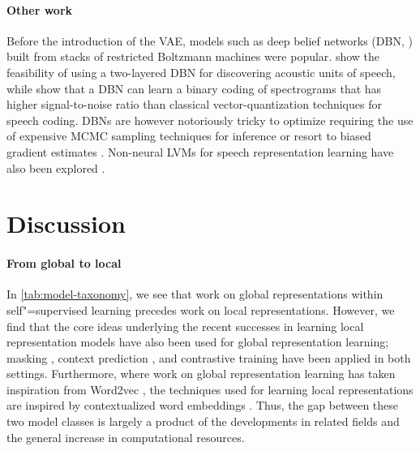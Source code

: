 {\paragraph{Other work}
Before the introduction of the VAE, models such as deep belief networks (DBN, \citealp{hinton_fast_2006}) built from stacks of restricted Boltzmann machines \parencite{smolensky_chapter_1986,fischer_training_2014} were popular. \textcite{lee_unsupervised_2009} show the feasibility of using a two-layered DBN for discovering acoustic units of speech, while \textcite{deng_binary_2010} show that a DBN can learn a binary coding of spectrograms that has higher signal-to-noise ratio than classical vector-quantization techniques for speech coding.
DBNs are however notoriously tricky to optimize requiring the use of expensive MCMC sampling techniques for inference or resort to biased gradient estimates \parencite{montavon_practical_2012,fischer_bounding_2011}.
Non-neural LVMs for speech representation learning have also been explored
\parencite{lee_nonparametric_2012, ondel_variational_2016, heck_feature_2017, jansen_weak_2013}.


\section{Discussion}
\label{sec:mtax}

\paragraph{From global to local} 
In \cref{tab:model-taxonomy}, we see that work on global representations within self"=supervised learning precedes work on local representations. However, we find that the core ideas underlying the recent successes in learning local representation models have also been used for global representation learning; masking \parencite{chung_audio_2016}, context prediction \parencite{chung_speech2vec_2018}, and contrastive training \parencite{milde_unspeech_2018} have been applied in both settings. Furthermore, where work on global representation learning has taken inspiration from Word2vec \parencite{mikolov_distributed_2013}, the techniques used for learning local representations are inspired by contextualized word embeddings \parencite{devlin_bert_2018}. Thus, the gap between these two model classes is largely a product of the developments in related fields and the general increase in computational resources.

}
